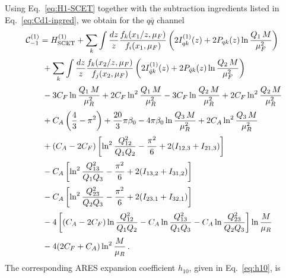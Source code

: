 Using Eq.~\eqref{eq:H1-SCET} together with the subtraction ingredients
listed in Eq.~\eqref{eq:Cd1-ingred}, we obtain for the
$q\bar{q}$ channel
\begin{equation}
\begin{aligned}
&\mathcal{C}^{(1)}_{-1} = H_{\rm SCET}^{(1)}+\sum_{k}\int\frac{dz}{z} \frac{f_k(x_1/z,\mu_F)}{f_i(x_1,\mu_F)}\left(2I_{qk}^{(1)}(z)+2P_{qk}(z)\ln\frac{Q_1\,M}{\mu_F^2}\right)\\[0.5ex]
&\qquad+\sum_{k}\int\frac{dz}{z} \frac{f_k(x_2/z,\mu_F)}{f_j(x_2,\mu_F)}\left(2I_{\bar{q}k}^{(1)}(z)+2P_{\bar{q}k}(z)\ln\frac{Q_2\,M}{\mu_F^2}\right)\\[0.5ex]
&\qquad -3C_F\ln\frac{Q_1\,M}{\mu_R^2}+2C_F\ln^2\frac{Q_1\,M}{\mu_R^2}-3C_F\ln\frac{Q_2\,M}{\mu_R^2}+2C_F\ln^2\frac{Q_2\,M}{\mu_R^2} \\[0.5ex]
&\qquad + C_A\left(\frac{4}{3}-\pi^2\right)+\frac{20}{3}\pi\beta_0-4\pi\beta_0\ln\frac{Q_3\,M}{\mu_R^2}+2C_A\ln^2\frac{Q_3\,M}{\mu_R^2}\\[0.5ex]
&\qquad+(C_A-2C_F)\left[\ln^2\frac{Q_{12}^2}{Q_1 Q_2}-\frac{\pi^2}{6}+2(I_{12,3}+I_{21,3})\right] \\[0.5ex]
&\qquad-C_A\left[\ln^2\frac{Q_{13}^2}{Q_1 Q_3}-\frac{\pi^2}{6}+2(I_{13,2}+I_{31,2})\right] \\[0.5ex]
&\qquad-C_A\left[\ln^2\frac{Q_{23}^2}{Q_2 Q_3}-\frac{\pi^2}{6}+2(I_{23,1}+I_{32,1})\right] \\[0.5ex]
&\qquad -4\left[(C_A-2C_F)\ln\frac{Q_{12}^2}{Q_1Q_2}-C_A\ln\frac{Q_{13}^2}{Q_1Q_3}-C_A\ln\frac{Q_{23}^2}{Q_2Q_3}\right]\ln\frac{M}{\mu_R}\\[0.5ex]
&\qquad -4(2C_F+C_A)\ln^2\frac{M}{\mu_R}\,.
\end{aligned}
\end{equation}
%
The corresponding \textsc{ARES} expansion coefficient $h_{10}$,
given in Eq.~\eqref{eq:h10}, is
